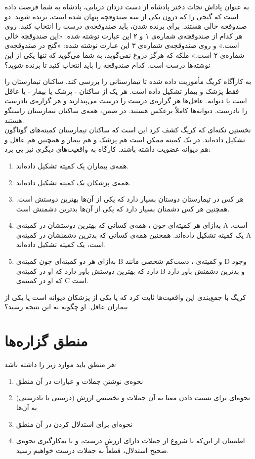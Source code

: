 \begin{problem} \label{loprpirates}
	به عنوان پاداش نجات دختر پادشاه از دست دزدان دریایی، پادشاه به شما فرصت داده است که گنجی را که درون یکی از سه صندوقچه پنهان شده است، برنده شوید. دو صندوقچه خالی هستند. برای برنده شدن، باید صندوقچه‌ی درست را انتخاب کنید. روی هر کدام از صندوقچه‌ی شماره‌ی ۱ و ۲ این عبارت نوشته شده: «این صندوقچه خالی است.» و روی صندوقچه‌ی شماره‌ی ۳ این عبارت نوشته شده: «گنج در صندوقچه‌ی شماره‌ی ۲ است.» ملکه که هرگز دروغ نمی‌گوید، به شما می‌گوید که تنها یکی از این نوشته‌ها درست است. کدام صندوقچه را باید انتخاب کنید تا برنده شوید؟
\end{problem}

\begin{problem} \label{loprkraig}
	به کارآگاه کریگ مأموریت داده شده تا تیمارستانی را بررسی کند. ساکنان تیمارستان را فقط پزشک و بیمار تشکیل داده است. هر یک از ساکنان - پزشک یا بیمار - یا عاقل است یا دیوانه. عاقل‌ها هر گزاره‌ی درست را درست می‌پندارند و هر گزاره‌ی نادرست را نادرست. دیوانه‌ها کاملاً برعکس هستند. در ضمن، همه‌ی ساکنان تیمارستان راستگو هستند. \\
	نخستین نکته‌ای که کریگ کشف کرد این است که ساکنان تیمارستان کمیته‌های گوناگون تشکیل داده‌اند. در یک کمیته ممکن است هم پزشک و هم بیمار و همچنین هم عاقل و هم دیوانه عضویت داشته باشند. کارگاه به واقعیت‌های دیگری نیز پی برد:
	\begin{enumerate}
		\item 
		همه‌ی بیماران یک کمیته تشکیل داده‌اند.
		\item 
		همه‌ی پزشکان یک کمیته تشکیل داده‌اند.
		\item 
		هر کس در تیمارستان دوستان بسیار دارد که یکی از آن‌ها بهترین دوستش است. همچنین هر کس دشمنان بسیار دارد که یکی از آن‌ها بدترین دشمنش است.
		\item 
		به‌ازای هر کمیته‌ای چون ، همه‌ی کسانی که بهترین دوستشان در کمیته‌ی A است، یک کمیته تشکیل داده‌اند. همچنین همه‌ی کسانی که بدترین دشمنشان در کمیته‌ی A است، یک کمیته تشکیل داده‌اند.
		\item 
		به‌ازای هر دو کمیته‌ای چون کمیته‌ی B و کمیته‌ی ، دست‌کم شخصی مانند D وجود دارد که بهترین دوستش باور دارد که او در کمیته‌ی B و بدترین دشمنش باور دارد که او در کمیته‌ی C است.
	\end{enumerate}
	کریگ با جمع‌بندی این واقعیت‌ها ثابت کرد که یا یکی از پزشکان دیوانه است یا یکی از بیماران عاقل. او چگونه به این نتیجه رسید؟
\end{problem}

\section{منطق گزاره‌ها}
هر منطق باید موارد زیر را داشته باشد:
\begin{enumerate}
	\item 
	نحوه‌ی نوشتن جملات و عبارات در آن منطق
	\item 
	نحوه‌ای برای نسبت دادن معنا به آن جملات و تخصیص ارزش (درستی یا نادرستی) به آن‌ها
	\item 
	نحوه‌ای برای استدلال کردن در آن منطق
	\item 
	اطمینان از این‌که با شروع از جملات دارای ارزش درست، و با به‌کارگیری نحوه‌ی صحیح استدلال، قطعاً به جملات درست خواهیم رسید.
\end{enumerate}

